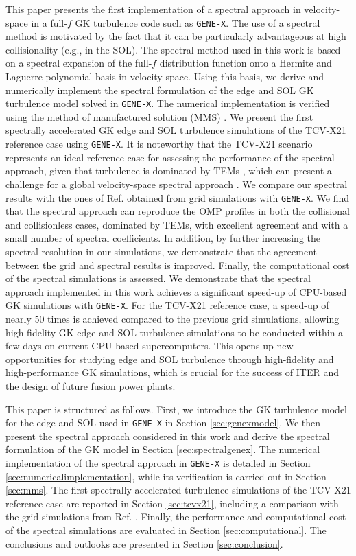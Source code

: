 \documentclass[preprint,12pt]{elsarticle}
\begin{document}
This paper presents the first implementation of a spectral approach in velocity-space in a full-$f$ GK turbulence code such as \verb|GENE-X|. The use of a spectral method is motivated by the fact that it can be particularly advantageous at high collisionality (e.g., in the SOL). The spectral method used in this work is based on a spectral expansion of the full-$f$ distribution function onto a Hermite and Laguerre polynomial basis in velocity-space. Using this basis, we derive and numerically implement the spectral formulation of the edge and SOL GK turbulence model solved in \verb|GENE-X|. The numerical implementation is verified using the method of manufactured solution (MMS) \cite{roache2002}. 
We present the first spectrally accelerated GK edge and SOL turbulence simulations of the TCV-X21 reference case using \verb|GENE-X|. It is noteworthy that the TCV-X21 scenario represents an ideal reference case for assessing the performance of the spectral approach, given that turbulence is dominated by TEMs \cite{ulbl2023}, which can present a challenge for a global velocity-space spectral approach \cite{frei2023}. We compare our spectral results with the ones of Ref. \cite{ulbl2023} obtained from grid simulations with \verb|GENE-X|. We find that the spectral approach can reproduce the OMP profiles in both the collisional and collisionless cases, dominated by TEMs, with excellent agreement and with a small number of spectral coefficients. In addition, by further increasing the spectral resolution in our simulations, we demonstrate that the agreement between the grid and spectral results is improved. Finally, the computational cost of the spectral simulations is assessed. We demonstrate that the spectral approach implemented in this work achieves a significant speed-up of CPU-based GK simulations with \verb|GENE-X|. For the TCV-X21 reference case, a speed-up of nearly $50$ times is achieved compared to the previous grid simulations, allowing high-fidelity GK edge and SOL turbulence simulations to be conducted within a few days on current CPU-based supercomputers. This opens up new opportunities for studying edge and SOL turbulence through high-fidelity and high-performance GK simulations, which is crucial for the success of ITER and the design of future fusion power plants.

This paper is structured as follows. First, we introduce the GK turbulence model for the edge and SOL used in \verb|GENE-X| in Section \ref{sec:genexmodel}. We then present the spectral approach considered in this work and derive the spectral formulation of the GK model in Section \ref{sec:spectralgenex}. The numerical implementation of the spectral approach in \verb|GENE-X| is detailed in Section \ref{sec:numericalimplementation}, while its verification is carried out in Section \ref{sec:mms}. The first spectrally accelerated turbulence simulations of the TCV-X21 reference case are reported in Section \ref{sec:tcvx21}, including a comparison with the grid simulations from Ref. \cite{ulbl2023}. Finally, the performance and computational cost of the spectral simulations are evaluated in Section \ref{sec:computational}. The conclusions and outlooks are presented in Section \ref{sec:conclusion}.
\end{document}
